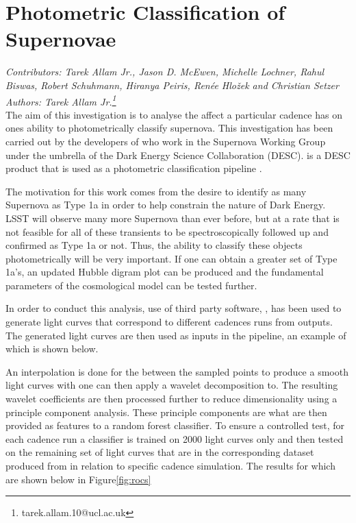 \usepackage{graphicx}
\usepackage{subcaption}
\usepackage{float}

\section{Photometric Classification of Supernovae}
\textit{Contributors: Tarek Allam Jr., Jason D. McEwen, Michelle Lochner, Rahul
Biswas, Robert Schuhmann, Hiranya Peiris, Ren\'ee Hlo\v{z}ek and Christian Setzer} \\
\textit{Authors: Tarek Allam Jr.\footnote{tarek.allam.10@ucl.ac.uk}} \\

The aim of this investigation is to analyse the affect a particular cadence has
on ones ability to photometrically classify supernova. This investigation has been carried out by the
developers of  who work in the Supernova Working Group under the umbrella of the Dark Energy Science
Collaboration (DESC).  is a DESC product that is used as a photometric
classification pipeline \cite{lochner2016photometric}.

The motivation for this work comes from the desire to identify as many Supernova
as Type 1a in order to help constrain the nature of Dark Energy.
LSST will observe many more Supernova than ever before, but at a rate that is
not feasible for all of these transients to be spectroscopically followed up and
confirmed as Type 1a or not.
Thus, the ability to classify these objects photometrically will be very
important. If one can obtain a greater set of Type 1a's, an updated Hubble
digram plot can be produced and the fundamental parameters of the cosmological
model can be tested further.

In order to conduct this analysis, use of third
party software, , has been used to generate light curves that correspond to
different cadences runs from  outputs. The generated light curves are
then used as inputs in the  pipeline, an example of which is
shown below.

An interpolation is done for the between the sampled points to produce a smooth
light curves with one can then apply a wavelet decomposition to. The resulting
wavelet coefficients are then processed further to reduce dimensionality using a
principle component analysis. These principle components are what are then
provided as features to a random forest classifier. To ensure a controlled test,
for each cadence run a classifier is trained on 2000 light
curves only and then tested on the remaining set of light curves that are in the
corresponding dataset produced from  in relation to specific  cadence
simulation. The results for which are shown below in Figure\ref{fig:rocs}

